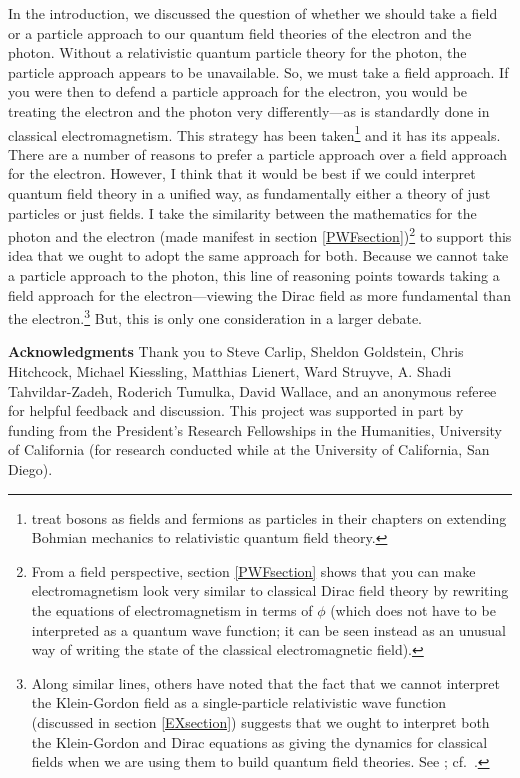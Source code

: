 \documentclass[12pt,secnumarabic,amsmath,amssymb,balancelastpage,nofootinbib]{article}
\begin{document}
In the introduction, we discussed the question of whether we should take a field or a particle approach to our quantum field theories of the electron and the photon.  Without a relativistic quantum particle theory for the photon, the particle approach appears to be unavailable.  So, we must take a field approach.  If you were then to defend a particle approach for the electron, you would be treating the electron and the photon very differently---as is standardly done in classical electromagnetism.  This strategy has been taken\footnote{\citet{bohmhiley} treat bosons as fields and fermions as particles in their chapters on extending Bohmian mechanics to relativistic quantum field theory.} and it has its appeals.  There are a number of reasons to prefer a particle approach over a field approach for the electron.  However, I think that it would be best if we could interpret quantum field theory in a unified way, as fundamentally either a theory of just particles or just fields.  I take the similarity between the mathematics for the photon and the electron (made manifest in section \ref{PWFsection})\footnote{From a field perspective, section \ref{PWFsection} shows that you can make electromagnetism look very similar to classical Dirac field theory by rewriting the equations of electromagnetism in terms of $\phi$ (which does not have to be interpreted as a quantum wave function; it can be seen instead as an unusual way of writing the state of the classical electromagnetic field).} to support this idea that we ought to adopt the same approach for both.  Because we cannot take a particle approach to the photon, this line of reasoning points towards taking a field approach for the electron---viewing the Dirac field as more fundamental than the electron.\footnote{Along similar lines, others have noted that the fact that we cannot interpret the Klein-Gordon field as a single-particle relativistic wave function (discussed in section \ref{EXsection}) suggests that we ought to interpret both the Klein-Gordon and Dirac equations as giving the dynamics for classical fields when we are using them to build quantum field theories.  See \citet[ch.\ 4]{ryder1996}; cf.\ \citet[sec.\ 3]{flemingbutterfield1999}.}  But, this is only one consideration in a larger debate.



\vspace*{12 pt}
\noindent
\textbf{Acknowledgments}
Thank you to Steve Carlip, Sheldon Goldstein, Chris Hitchcock, Michael Kiessling, Matthias Lienert, Ward Struyve, A. Shadi Tahvildar-Zadeh, Roderich Tumulka, David Wallace, and an anonymous referee for helpful feedback and discussion.  This project was supported in part by funding from the President's Research Fellowships in the Humanities, University of California (for research conducted while at the University of California, San Diego).
\end{document}
